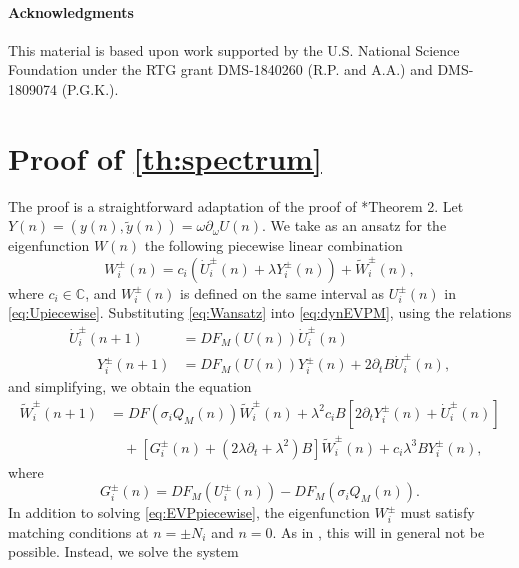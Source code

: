 \documentclass[12pt,reqno]{amsart}
\def\C{{\mathbb C}}
\theoremstyle{definition}
\begin{document}
\paragraph{\textbf{Acknowledgments}}

This material is based upon work supported by the U.S. National Science Foundation under the RTG grant DMS-1840260 (R.P. and A.A.)
and DMS-1809074 (P.G.K.).

\appendix

\section{Proof of \texorpdfstring{\cref{th:spectrum}}{Theorem 2} }\label{app:specproof}

The proof is a straightforward adaptation of the proof of \cite{Parker2020}*{Theorem 2}. Let $Y(n) = (y(n), \tilde{y}(n)) = \omega \partial_\omega U(n)$. We take as an ansatz for the eigenfunction $W(n)$ the following piecewise linear combination
\begin{equation}\label{eq:Wansatz}
W_i^\pm(n) = c_i ( \dot{U}_i^\pm(n) + \lambda Y_i^\pm(n) ) + \tilde{W}_i^\pm(n),
\end{equation}
where $c_i \in \C$, and $W_i^\pm(n)$ is defined on the same interval as $U_i^\pm(n)$ in \cref{eq:Upiecewise}. Substituting \cref{eq:Wansatz} into \cref{eq:dynEVPM}, using the relations
\begin{equation}
\begin{aligned}
\dot{U}_i^\pm(n+1) &= DF_M(U(n))\dot{U}_i^\pm(n) \\ 
\qquad Y_i^\pm(n+1) &= DF_M(U(n)) Y_i^\pm(n) + 2 \partial_t B \dot{U}_i^\pm(n),
\end{aligned}
\end{equation}
and simplifying, we obtain the equation
\begin{equation}\label{eq:EVPpiecewise}
\begin{aligned}
\tilde{W}_i^\pm(n+1) &= DF(\sigma_i Q_M(n)) \tilde{W}_i^\pm(n) + \lambda^2 c_i B[ 2 \partial_t Y_i^\pm(n) + \dot{U}_i^\pm(n)] \\
&\quad+ [G_i^\pm(n) + (2 \lambda \partial_t + \lambda^2) B] \tilde{W}_i^\pm(n) + c_i \lambda^3 B Y_i^\pm(n),
\end{aligned}
\end{equation}
where
\begin{equation}\label{eq:Gipm}
G_i^\pm(n) = DF_M(U_i^\pm(n)) - DF_M(\sigma_i Q_M(n)).
\end{equation}
In addition to solving \cref{eq:EVPpiecewise}, the eigenfunction $W_i^\pm$ must satisfy matching conditions at $n = \pm N_i$ and $n = 0$. As in \cites{Parker2020,Parker2021,Sandstede1998}, this will in general not be possible. Instead, we solve the system 
\end{document}
